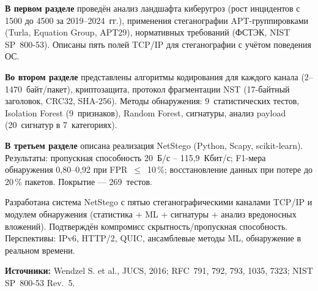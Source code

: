 \documentclass[bachelor, och, autoref]{SCWorks1}
\begin{document}
\textbf{В первом разделе} проведён анализ ландшафта киберугроз (рост инцидентов с 1500 до 4500 за 2019--2024~гг.), применения стеганографии APT-группировками (Turla, Equation Group, APT29), нормативных требований (ФСТЭК, NIST SP~800-53). Описаны пять полей TCP/IP для стеганографии с учётом поведения ОС.

\textbf{Во втором разделе} представлены алгоритмы кодирования для каждого канала (2--1470~байт/пакет), криптозащита, протокол фрагментации NST (17-байтный заголовок, CRC32, SHA-256). Методы обнаружения: 9~статистических тестов, Isolation Forest (9~признаков), Random Forest, сигнатуры, анализ payload (20~сигнатур в 7~категориях).

\textbf{В третьем разделе} описана реализация NetStego (Python, Scapy, scikit-learn). Результаты: пропускная способность 20~Б/с -- 115{,}9~Кбит/с; F1-мера обнаружения 0{,}80--0{,}92 при FPR~$\leq$~10\,\%; восстановление данных при потере до 20\,\% пакетов. Покрытие --- 269~тестов.

\conclusion

Разработана система NetStego с пятью стеганографическими каналами TCP/IP и модулем обнаружения (статистика + ML + сигнатуры + анализ вредоносных вложений). Подтверждён компромисс скрытность/пропускная способность. Перспективы: IPv6, HTTP/2, QUIC, ансамблевые методы ML, обнаружение в реальном времени.

\textbf{Источники:}
Wendzel S. et al., JUCS, 2016;
RFC~791, 792, 793, 1035, 7323;
NIST SP~800-53 Rev.~5.
\end{document}
